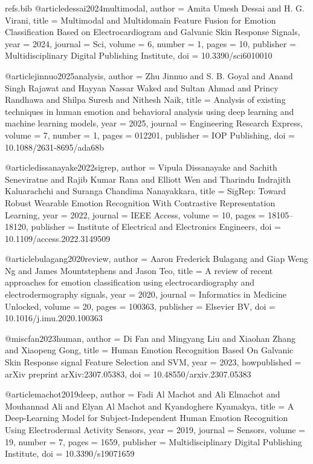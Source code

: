 \begin{filecontents*}[overwrite]{refs.bib}
@article{dessai2024multimodal,
  author = {Amita Umesh Dessai and H. G. Virani},
  title = {{Multimodal and Multidomain Feature Fusion for Emotion Classification Based on Electrocardiogram and Galvanic Skin Response Signals}},
  year = {2024},
  journal = {Sci},
  volume = {6},
  number = {1},
  pages = {10},
  publisher = {Multidisciplinary Digital Publishing Institute},
  doi = {10.3390/sci6010010}
}

@article{jinnuo2025analysis,
  author = {Zhu Jinnuo and S. B. Goyal and Anand Singh Rajawat and Hayyan Nassar Waked and Sultan Ahmad and Princy Randhawa and Shilpa Suresh and Nithesh Naik},
  title = {{Analysis of existing techniques in human emotion and behavioral analysis using deep learning and machine learning models}},
  year = {2025},
  journal = {Engineering Research Express},
  volume = {7},
  number = {1},
  pages = {012201},
  publisher = {IOP Publishing},
  doi = {10.1088/2631-8695/ada68b}
}

@article{dissanayake2022sigrep,
  author = {Vipula Dissanayake and Sachith Seneviratne and Rajib Kumar Rana and Elliott Wen and Tharindu Indrajith Kaluarachchi and Suranga Chandima Nanayakkara},
  title = {{SigRep: Toward Robust Wearable Emotion Recognition With Contrastive Representation Learning}},
  year = {2022},
  journal = {IEEE Access},
  volume = {10},
  pages = {18105--18120},
  publisher = {Institute of Electrical and Electronics Engineers},
  doi = {10.1109/access.2022.3149509}
}

@article{bulagang2020review,
  author = {Aaron Frederick Bulagang and Giap Weng Ng and James Mountstephens and Jason Teo},
  title = {{A review of recent approaches for emotion classification using electrocardiography and electrodermography signals}},
  year = {2020},
  journal = {Informatics in Medicine Unlocked},
  volume = {20},
  pages = {100363},
  publisher = {Elsevier BV},
  doi = {10.1016/j.imu.2020.100363}
}

@misc{fan2023human,
  author = {Di Fan and Mingyang Liu and Xiaohan Zhang and Xiaopeng Gong},
  title = {{Human Emotion Recognition Based On Galvanic Skin Response signal Feature Selection and SVM}},
  year = {2023},
  howpublished = {arXiv preprint arXiv:2307.05383},
  doi = {10.48550/arxiv.2307.05383}
}

@article{machot2019deep,
  author = {Fadi Al Machot and Ali Elmachot and Mouhannad Ali and Elyan Al Machot and Kyandoghere Kyamakya},
  title = {{A Deep-Learning Model for Subject-Independent Human Emotion Recognition Using Electrodermal Activity Sensors}},
  year = {2019},
  journal = {Sensors},
  volume = {19},
  number = {7},
  pages = {1659},
  publisher = {Multidisciplinary Digital Publishing Institute},
  doi = {10.3390/s19071659}
}


\end{filecontents*}
